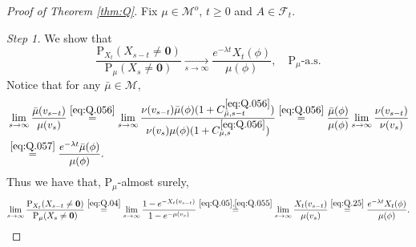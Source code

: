 \documentclass[12pt,a4paper]{amsart}
\numberwithin{equation}{section}
\theoremstyle{plain}
\theoremstyle{definition}
\theoremstyle{remark}
\begin{document}
\begin{proof}[Proof of Theorem \ref{thm:Q}]
	Fix  $\mu\in \mathcal M^o$, $t\ge 0$ and $A\in\mathscr F_t$.
	
\emph{Step 1.} We show that
	\begin{equation} \label{eq:Q.1}
		\frac{\mathrm P_{X_t}(X_{s-t} \neq \mathbf 0)}{\mathrm P_\mu(X_{s} \neq \mathbf 0)}
		\xrightarrow[s\to \infty]{} \frac{e^{-\lambda t}X_t(\phi)}{\mu(\phi) },
		\quad \mathrm P_\mu\text{-a.s.}
\end{equation}
	Notice that for any $\bar \mu\in \mathcal M$,
	\begin{align}
		&\lim_{s\rightarrow\infty}\dfrac{ \bar \mu(v_{s-t}) }{ \mu(v_s) }
		\overset{\eqref{eq:Q.056}}=\lim_{s\to \infty} \frac{\nu(v_{s-t})\bar \mu (\phi) (1+C_{\bar \mu,s-t}^{\eqref{eq:Q.056}})}{\nu(v_s)\mu(\phi)(1+C_{\mu,s}^{\eqref{eq:Q.056}})}
		\overset{\eqref{eq:Q.056}}= \frac{\bar \mu(\phi)}{\mu(\phi)}\lim_{s\to \infty} \frac{\nu(v_{s-t}) }{\nu(v_s)}
		\\\label{eq:Q.25}&\overset{\eqref{eq:Q.057}}= \frac{e^{-\lambda t} \bar \mu(\phi)}{\mu(\phi)}.
	\end{align}
	Thus we have that, $\mathrm P_\mu$-almost surely,
	\begin{equation}
		\lim_{s\to\infty}\frac{\mathrm P_{X_t}(X_{s-t}\neq \mathbf 0)}{\mathrm P_\mu(X_s\neq \mathbf 0)}
		\overset{\eqref{eq:Q.04}}=\lim_{s\to\infty}\frac{1-e^{- X_t(v_{s-t}) }}{1-e^{- \mu(v_s) }}
		\overset{\eqref{eq:Q.05},\eqref{eq:Q.055}}=\lim_{s\rightarrow\infty}\dfrac{ X_t(v_{s-t}) }{ \mu(v_s) }
		\overset{\eqref{eq:Q.25}}= \frac{e^{-\lambda t} X_t(\phi)}{\mu(\phi)}.
	\end{equation}


\end{proof}
\end{document}
